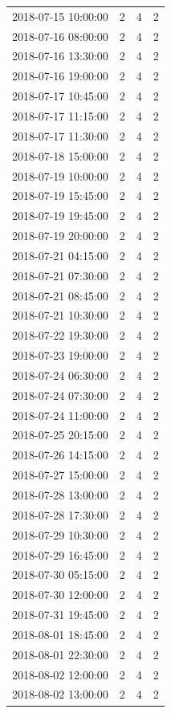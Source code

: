 \begin{tabular}{lrrr}
2018-07-15 10:00:00 & 2 & 4 & 2 \\
2018-07-16 08:00:00 & 2 & 4 & 2 \\
2018-07-16 13:30:00 & 2 & 4 & 2 \\
2018-07-16 19:00:00 & 2 & 4 & 2 \\
2018-07-17 10:45:00 & 2 & 4 & 2 \\
2018-07-17 11:15:00 & 2 & 4 & 2 \\
2018-07-17 11:30:00 & 2 & 4 & 2 \\
2018-07-18 15:00:00 & 2 & 4 & 2 \\
2018-07-19 10:00:00 & 2 & 4 & 2 \\
2018-07-19 15:45:00 & 2 & 4 & 2 \\
2018-07-19 19:45:00 & 2 & 4 & 2 \\
2018-07-19 20:00:00 & 2 & 4 & 2 \\
2018-07-21 04:15:00 & 2 & 4 & 2 \\
2018-07-21 07:30:00 & 2 & 4 & 2 \\
2018-07-21 08:45:00 & 2 & 4 & 2 \\
2018-07-21 10:30:00 & 2 & 4 & 2 \\
2018-07-22 19:30:00 & 2 & 4 & 2 \\
2018-07-23 19:00:00 & 2 & 4 & 2 \\
2018-07-24 06:30:00 & 2 & 4 & 2 \\
2018-07-24 07:30:00 & 2 & 4 & 2 \\
2018-07-24 11:00:00 & 2 & 4 & 2 \\
2018-07-25 20:15:00 & 2 & 4 & 2 \\
2018-07-26 14:15:00 & 2 & 4 & 2 \\
2018-07-27 15:00:00 & 2 & 4 & 2 \\
2018-07-28 13:00:00 & 2 & 4 & 2 \\
2018-07-28 17:30:00 & 2 & 4 & 2 \\
2018-07-29 10:30:00 & 2 & 4 & 2 \\
2018-07-29 16:45:00 & 2 & 4 & 2 \\
2018-07-30 05:15:00 & 2 & 4 & 2 \\
2018-07-30 12:00:00 & 2 & 4 & 2 \\
2018-07-31 19:45:00 & 2 & 4 & 2 \\
2018-08-01 18:45:00 & 2 & 4 & 2 \\
2018-08-01 22:30:00 & 2 & 4 & 2 \\
2018-08-02 12:00:00 & 2 & 4 & 2 \\
2018-08-02 13:00:00 & 2 & 4 & 2 \\

\end{tabular}
